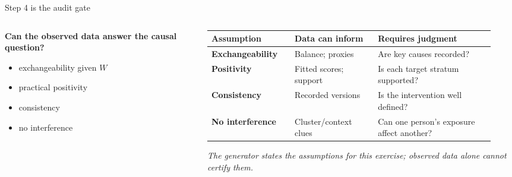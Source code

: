 \documentclass[aspectratio=169]{beamer}
\begin{document}
\begin{frame}{Step 4 is the audit gate}
  \begin{columns}[T,onlytextwidth]
    \begin{column}{0.31\textwidth}
      {\large\bfseries
        Can the observed data answer the causal question?}

      \vspace{0.20cm}
      \footnotesize
      \begin{itemize}
        \item exchangeability given \(W\)
        \item practical positivity
        \item consistency
        \item no interference
      \end{itemize}

      {\scriptsize
        }
    \end{column}
    \begin{column}{0.65\textwidth}
      \footnotesize
      {\setlength{\tabcolsep}{3pt}%
      \begin{tabular}{@{}>{\bfseries}L{0.27\linewidth}L{0.27\linewidth}L{0.38\linewidth}@{}}
        Assumption & Data can inform & Requires judgment\\
        \midrule
        Exchangeability & Balance; proxies & Are key causes recorded?\\[0.18cm]
        Positivity & Fitted scores; support & Is each target stratum supported?\\[0.18cm]
        Consistency & Recorded versions & Is the intervention well defined?\\[0.18cm]
        No interference & Cluster/context clues & Can one person's exposure affect another?
      \end{tabular}}

      \vspace{0.16cm}
      {\scriptsize\itshape\color{black!55}
        The generator states the assumptions for this exercise; observed data
        alone cannot certify them.}
    \end{column}
  \end{columns}
\end{frame}
\end{document}
